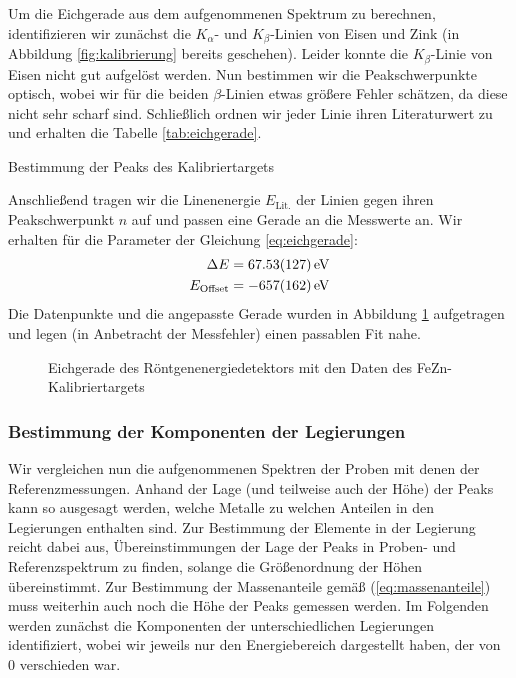 \documentclass[11pt, a4paper]{article}
\begin{document}
Um die Eichgerade aus dem aufgenommenen Spektrum zu berechnen, identifizieren wir zunächst die $K_\alpha$- und $K_\beta$-Linien von Eisen und Zink (in Abbildung \ref{fig:kalibrierung} bereits geschehen).
Leider konnte die $K_\beta$-Linie von Eisen nicht gut aufgelöst werden.
Nun bestimmen wir die Peakschwerpunkte optisch, wobei wir für die beiden $\beta$-Linien etwas größere Fehler schätzen, da diese nicht sehr scharf sind.
Schließlich ordnen wir jeder Linie ihren Literaturwert zu und erhalten die Tabelle \ref{tab:eichgerade}.
\begin{table}[h]
\centering

\caption{Bestimmung der Peaks des Kalibriertargets}
\label{tab:eichgerade}
\end{table}

Anschließend tragen wir die Linenenergie $E_\mathrm{Lit.}$ der Linien gegen ihren Peakschwerpunkt $n$ auf und passen eine Gerade an die Messwerte an.
Wir erhalten für die Parameter der Gleichung \ref{eq:eichgerade}:
\begin{align}
  \Delta E &= \SI{67,53 +- 1,27}{\electronvolt}\\
  E_\mathrm{Offset} &= \SI{-657 +- 162}{\electronvolt}
\end{align}
Die Datenpunkte und die angepasste Gerade wurden in Abbildung \ref{fig:energieeichung} aufgetragen und legen (in Anbetracht der Messfehler) einen passablen Fit nahe.

\begin{figure}[h]
\centering
\resizebox{\columnwidth}{!}{%
}
\caption{Eichgerade des Röntgenenergiedetektors mit den Daten des FeZn-Kalibriertargets}
\label{fig:energieeichung}
\end{figure}

\subsubsection{Bestimmung der Komponenten der Legierungen}

Wir vergleichen nun die aufgenommenen Spektren der Proben mit denen der Referenzmessungen.
Anhand der Lage (und teilweise auch der Höhe) der Peaks kann so ausgesagt werden, welche Metalle zu welchen Anteilen in den Legierungen enthalten sind.
Zur Bestimmung der Elemente in der Legierung reicht dabei aus, Übereinstimmungen der Lage der Peaks in Proben- und Referenzspektrum zu finden, solange die Größenordnung der Höhen übereinstimmt.
Zur Bestimmung der Massenanteile gemäß (\ref{eq:massenanteile}) muss weiterhin auch noch die Höhe der Peaks gemessen werden.
Im Folgenden werden zunächst die Komponenten der unterschiedlichen Legierungen identifiziert, wobei wir jeweils nur den Energiebereich dargestellt haben, der von $0$ verschieden war.
\end{document}
